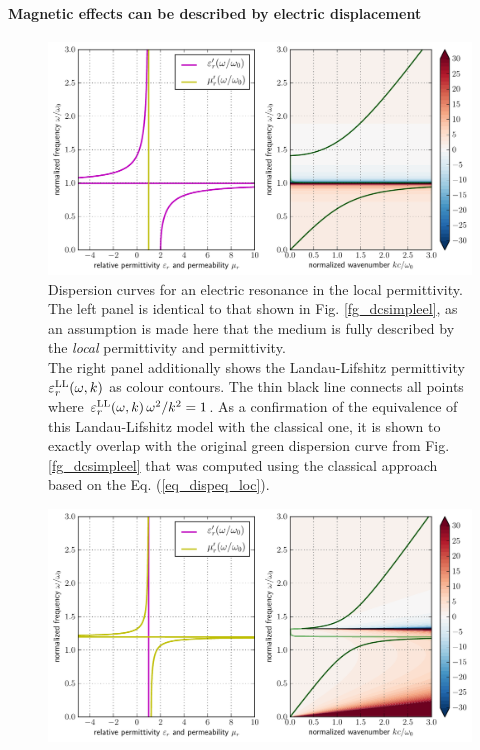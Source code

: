 \paragraph{Magnetic effects can be described by electric displacement}%
\begin{figure}[ht] \caption{Dispersion curves for an electric resonance in the local permittivity. The left panel is identical to that shown in Fig. \ref{fg_dcsimpleel}, as an assumption is made here that the medium is fully described by the \textit{local} permittivity and permittivity.\\
The right panel additionally shows the Landau-Lifshitz permittivity $\varepsilon_r^\text{LL}(\omega, k)$ as colour contours. The thin black line connects all points where $\varepsilon_r^\text{LL}(\omega, k) \,\omega^2 / k^2 = 1$. As a confirmation of the equivalence of this Landau-Lifshitz model with the classical one, it is shown to exactly overlap with the original green dispersion curve from Fig. \ref{fg_dcsimpleel} that was computed using the classical approach based on the Eq. (\ref{eq_dispeq_loc}). } \label{fg_dcllel} \centering  %
	\includegraphics[width=17cm]{img/dispersion_landau_lifshitz/dispersion_ll_el.pdf}
\end{figure}\clearpage
\begin{figure}[ht] \caption{} \label{fg_dcllmag} \centering  %
	\includegraphics[width=17cm]{img/dispersion_landau_lifshitz/dispersion_ll_mag.pdf}
\end{figure}
